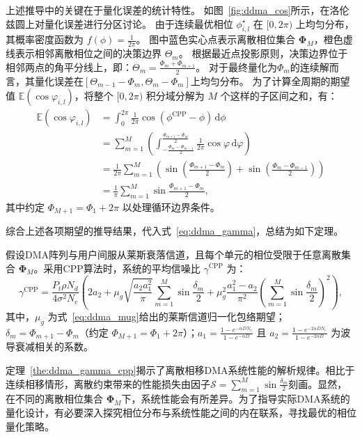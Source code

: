 上述推导中的关键在于量化误差的统计特性。
如图~\ref{fig:ddma_cos}所示，在洛伦兹圆上对量化误差进行分区讨论。
由于连续最优相位 $\phi_{i,l}^\star$ 在 $[0, 2\pi)$ 上均匀分布，其概率密度函数为 $f(\phi) = \frac{1}{2\pi}$。
图中蓝色实心点表示离散相位集合 $\bm \Phi_M$，橙色虚线表示相邻离散相位之间的决策边界 $\Theta_m$。
根据最近点投影原则，决策边界位于相邻两点的角平分线上，即：$\Theta_m=\frac{\Phi_m+\Phi_{m+1}}{2}$。
对于最终量化为$\Phi_m$的连续解而言，其量化误差在$[\Theta_{m-1}-\Phi_m,\Theta_{m}-\Phi_m]$上均匀分布。
为了计算全周期的期望值 $\mathbb{E}(\cos \varphi_{i,l})$，将整个 $[0, 2\pi)$ 积分域分解为 $M$ 个这样的子区间之和，有：
\begin{align}
	\mathbb{E}(\cos \varphi_{i,l}) 
	&= \int_{0}^{2\pi} \frac{1}{2\pi}\cos(\phi^{\text{CPP}} - \phi) \, \mathrm{d}\phi \\
	&= \sum_{m=1}^M \left( \int_{-\frac{\Phi_{m}-\Phi_{m-1}}{2}}^{\frac{\Phi_{m+1}-\Phi_m}{2}} \frac{1}{2\pi} \cos \varphi \, \mathrm{d}\varphi \right) \\
	&= \frac{1}{2\pi} \sum_{m=1}^M
	\left( \sin\left(\frac{\Phi_{m+1}-\Phi_m}{2}\right)
	+ \sin\left(\frac{\Phi_{m}-\Phi_{m-1}}{2}\right)
	\right) \\
	&= \frac{1}{\pi} \sum_{m=1}^M \sin \frac{\Phi_{m+1}-\Phi_m}{2},\label{eq:ddma_E_cos_phi}
\end{align}
其中约定 $\Phi_{M+1} = \Phi_1 + 2\pi$ 以处理循环边界条件。

综合上述各项期望的推导结果，代入式~\eqref{eq:ddma_gamma}，总结为如下定理。

\begin{theorem}\label{the:ddma_gamma_cpp}
	假设DMA阵列与用户间服从莱斯衰落信道，且每个单元的相位受限于任意离散集合 $\bm \Phi_M$。采用CPP算法时，系统的平均信噪比 $\gamma^{\text{CPP}}$ 为：
	\begin{equation}\label{eq:ddma_gamma_cpp_closed}
		\gamma^{\text{CPP}} = \frac{P_t \rho N_d}{4\sigma^2 N_e} \left( 2a_2 + \mu_g \sqrt{\frac{a_2 a_1^2}{\pi}} \sum_{m=1}^M \sin \frac{\delta_m}{2} + \mu_g^2 \frac{a_1^2 - a_2}{\pi^2} \left( \sum_{m=1}^M \sin \frac{\delta_m}{2} \right)^2 \right),
	\end{equation}
	其中，$\mu_g$ 为式~\eqref{eq:ddma_mug}给出的莱斯信道归一化包络期望；$\delta_m = \Phi_{m+1}-\Phi_m$（约定 $\Phi_{M+1} = \Phi_1 + 2\pi$）；$a_1 = \frac{1 - e^{-\alpha D N_e}}{1 - e^{-\alpha D}}$ 且 $a_2 = \frac{1 - e^{-2\alpha D N_e}}{1 - e^{-2\alpha D}}$ 为波导衰减相关的系数。
\end{theorem}

定理~\ref{the:ddma_gamma_cpp}揭示了离散相移DMA系统性能的解析规律。相比于连续相移情形，离散约束带来的性能损失由因子$\mathcal{S}=\sum_{m=1}^M \sin \frac{\delta_m}{2}$刻画。显然，在不同的离散相位集合 $\bm \Phi_M$下，系统性能会有所差异。为了指导实际DMA系统的量化设计，有必要深入探究相位分布与系统性能之间的内在联系，寻找最优的相位量化策略。

